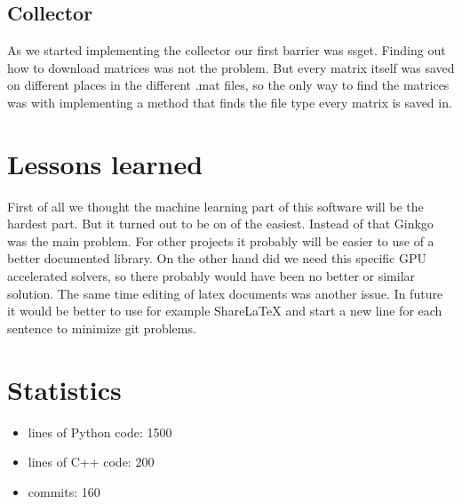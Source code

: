 \documentclass[parskip=full]{scrartcl}
\begin{document}
\subsection{Collector}
As we started implementing the collector our first barrier was \gls{ssget}. 
Finding out how to download matrices was not the problem.
But every matrix itself was saved on different places in the different .mat files, so the only way to find the matrices was with implementing a method that finds the file type every matrix is saved in.

\section{Lessons learned}
First of all we thought the machine learning part of this software will be the hardest part.
But it turned out to be on of the easiest.
Instead of that \gls{Ginkgo} was the main problem.
For other projects it probably will be easier to use of a better documented library.
On the other hand did we need this specific GPU accelerated solvers, so there probably would have been no better or similar solution.
The same time editing of latex documents was another issue.
In future it would be better to use for example ShareLaTeX and start a new line for each sentence to minimize git problems.

\section{Statistics}
 
\begin{itemize}

\item lines of Python code: 1500

\item lines of C++ code: 200

\item commits: 160

\end{itemize}
\end{document}
